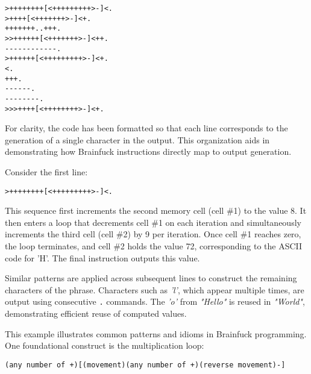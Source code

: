\begin{verbatim}
>++++++++[<+++++++++>-]<.
>++++[<+++++++>-]<+.
+++++++..+++.
>>++++++[<+++++++>-]<++.
------------.
>++++++[<+++++++++>-]<+.
<.
+++.
------.
--------.
>>>++++[<++++++++>-]<+.
\end{verbatim}

\par For clarity, the code has been formatted so that each line corresponds to the generation of a single character in the output. This organization aids in demonstrating how Brainfuck instructions directly map to output generation.

\par Consider the first line:

\begin{verbatim}
>++++++++[<+++++++++>-]<.
\end{verbatim}

\par This sequence first increments the second memory cell (cell \#1) to the value 8. It then enters a loop that decrements cell \#1 on each iteration and simultaneously increments the third cell (cell \#2) by 9 per iteration. Once cell \#1 reaches zero, the loop terminates, and cell \#2 holds the value 72, corresponding to the ASCII code for 'H'. The final instruction outputs this value.

\par Similar patterns are applied across subsequent lines to construct the remaining characters of the phrase. Characters such as \textit{'l'}, which appear multiple times, are output using consecutive \texttt{.} commands. The \textit{'o'} from \textit{"Hello"} is reused in \textit{"World"}, demonstrating efficient reuse of computed values.

\par This example illustrates common patterns and idioms in Brainfuck programming. One foundational construct is the multiplication loop:

\begin{verbatim}
(any number of +)[(movement)(any number of +)(reverse movement)-]
\end{verbatim}


